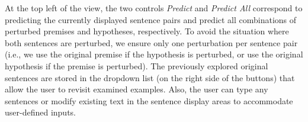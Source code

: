 At the top left of the view, the two controls \emph{Predict} and \emph{Predict All} correspond to predicting the currently displayed sentence pairs and predict all combinations of perturbed premises and hypotheses, respectively.
%
To avoid the situation where both sentences are perturbed, we ensure only one perturbation per sentence pair (i.e., we use the original premise if the hypothesis is perturbed, or use the original hypothesis if the premise is perturbed).
The previously explored original sentences are stored in the dropdown list (on the right side of the buttons) that allow the user to revisit examined examples.
Also, the user can type any sentences or modify existing text in the sentence display areas to accommodate user-defined inputs.



